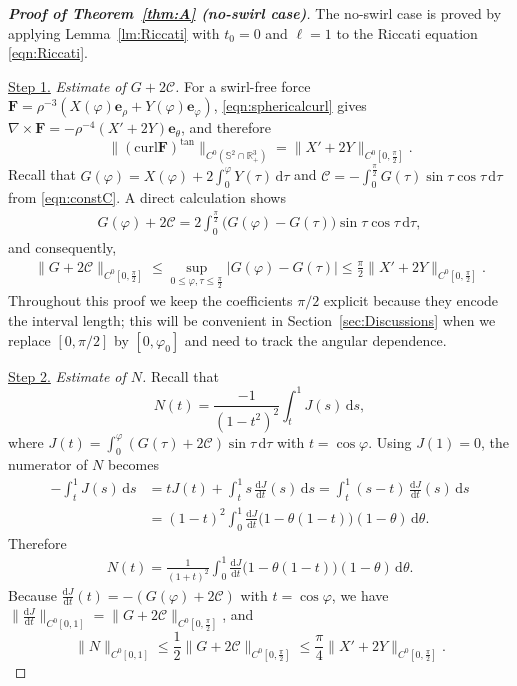 \documentclass[10pt,a4paper]{amsart}
\newcommand{\BF}{{\boldsymbol{F}}}
\newcommand{\Be}{{\boldsymbol{e}}}
\newcommand{\curl}{\mathrm{curl}}
\newcommand{\mcC}{\mathcal{C}}
\newcommand{\rmd}{\mathrm{d}}
\newcommand{\vp}{\varphi}
\begin{document}
\begin{proof}[\textbf{Proof of Theorem~\ref{thm:A} (no-swirl case)}]
The no-swirl case is proved by applying Lemma~\ref{lm:Riccati} with $t_0=0$ and $\ell=1$ to the Riccati equation \eqref{eqn:Riccati}.

\noindent
\underline{Step 1.} \emph{Estimate of $G+2\mcC$.}
For a swirl-free force $\BF = \rho^{-3}(X(\varphi)\Be_\rho + Y(\varphi)\Be_\varphi)$,
\eqref{eqn:sphericalcurl} gives $\nabla\times\BF = -\rho^{-4}(X'+2Y)\Be_\theta$,
and therefore
\[
\|(\curl\BF)^{\tan}\|_{C^0(\mathbb{S}^2\cap\mathbb{R}^3_+)} = \|X'+2Y\|_{C^0[0,\frac{\pi}{2}]}.
\]
Recall that $G(\vp)=X(\vp)+2\int_0^\vp Y(\tau)\, \rmd\tau$ and $\mcC=-\int_0^{\frac{\pi}{2}}G(\tau)\sin\tau \cos\tau \, \rmd\tau$ from \eqref{eqn:constC}.
A direct calculation shows
\begin{align}\label{eqn:Gand2C}
G(\vp)+2\mcC 
= 2\int_0^{\frac{\pi}{2}} \bigl(G(\vp)-G(\tau)\bigr)\sin\tau \cos\tau\, \rmd\tau,
\end{align}
and consequently,
\begin{align*}
\|G+2\mcC\|_{C^0[0,\frac{\pi}{2}]} 
\le \sup_{0 \le \vp,\tau \le \frac{\pi}{2}} |G(\vp)-G(\tau)|
\le \frac{\pi}{2} \|X'+2Y\|_{ C^0[0, \frac{\pi}{2}] }.
\end{align*}
Throughout this proof we keep the coefficients $\pi/2$ explicit because they encode the interval length; this will be convenient in Section~\ref{sec:Discussions} when we replace $[0,\pi/2]$ by $[0,\varphi_0]$ and need to track the angular dependence.

\noindent
\underline{Step 2.} \emph{Estimate of $N$.}
Recall that
\[
N(t)=\frac{-1}{(1-t^2)^2} \int_t^1 J(s) \, \rmd s,
\]
where $J(t)=\int_0^{\vp} (G(\tau) +2\mcC) \sin \tau \, \rmd\tau$ with $t=\cos\vp$.
Using $J(1)=0$, the numerator of $N$ becomes
\begin{equation*}
\begin{aligned}
- \int_t^1 J(s)\, \mathrm{d}s
&= t J(t) + \int_t^1 s \,\frac{\mathrm{d}J}{\mathrm{d}t}(s) \, \mathrm{d}s
= \int_t^1 (s-t)\, \frac{\mathrm{d}J}{\mathrm{d}t}(s)\, \mathrm{d}s \\
&= (1-t)^2 \int_0^1 \frac{\mathrm{d}J}{\mathrm{d}t}\bigl( 1-\theta(1-t) \bigr)(1-\theta) \, \mathrm{d}\theta .
\end{aligned}
\end{equation*}
Therefore
\begin{align}\label{eqn:NandJprime}
N(t) = \frac{1}{(1+t)^2}\int_0^1 \frac{\mathrm{d}J}{\mathrm{d}t}\bigl( 1-\theta(1-t)\bigr)(1-\theta) \, \rmd\theta.
\end{align}
Because $\frac{\mathrm{d}J}{\mathrm{d}t}(t) = -(G(\vp)+2\mcC)$ with $t=\cos\vp$, we have $\bigl\|\frac{\mathrm{d}J}{\mathrm{d}t}\bigr\|_{C^0[0,1]} = \|G+2\mcC\|_{C^0[0,\frac{\pi}2]}$, and
\[
\|N\|_{C^0[0,1]} \le \frac12 \|G+2\mcC\|_{C^0[0,\frac{\pi}{2}]} \le \frac{\pi}{4} \|X'+2Y\|_{ C^0[0, \frac{\pi}{2}] }.
\]


\end{proof}
\end{document}
